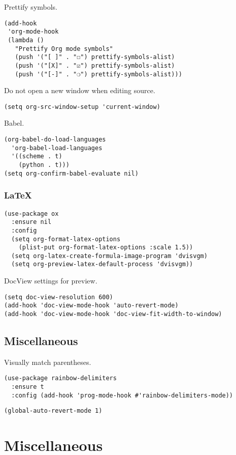 \documentclass[a4paper,11pt]{article}
\begin{document}
Prettify symbols.
\begin{verbatim}
(add-hook
 'org-mode-hook
 (lambda ()
   "Prettify Org mode symbols"
   (push '("[ ]" . "☐") prettify-symbols-alist)
   (push '("[X]" . "☑") prettify-symbols-alist)
   (push '("[-]" . "❍") prettify-symbols-alist)))
\end{verbatim}

Do not open a new window when editing source.
\begin{verbatim}
(setq org-src-window-setup 'current-window)
\end{verbatim}

Babel.
\begin{verbatim}
(org-babel-do-load-languages
  'org-babel-load-languages
  '((scheme . t)
    (python . t)))
(setq org-confirm-babel-evaluate nil)
\end{verbatim}

\subsubsection{\LaTeX{}}
\label{sec:org7bedf7a}
\begin{verbatim}
(use-package ox
  :ensure nil
  :config
  (setq org-format-latex-options
	(plist-put org-format-latex-options :scale 1.5))
  (setq org-latex-create-formula-image-program 'dvisvgm)
  (setq org-preview-latex-default-process 'dvisvgm))
\end{verbatim}

DocView settings for preview.
\begin{verbatim}
(setq doc-view-resolution 600)
(add-hook 'doc-view-mode-hook 'auto-revert-mode)
(add-hook 'doc-view-mode-hook 'doc-view-fit-width-to-window)
\end{verbatim}

\subsection{Miscellaneous}
\label{sec:org93bd6b9}
Visually match parentheses.
\begin{verbatim}
(use-package rainbow-delimiters
  :ensure t
  :config (add-hook 'prog-mode-hook #'rainbow-delimiters-mode))
\end{verbatim}

\begin{verbatim}
(global-auto-revert-mode 1)
\end{verbatim}

\section{Miscellaneous}
\label{sec:org4d2c179}
\end{document}
